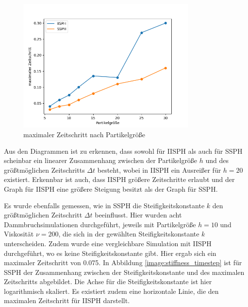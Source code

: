 \documentclass{scrreprt}
\begin{document}
\begin{figure}[htb]
    \includegraphics[width=0.8\textwidth]{particle_size_timestep.png}
    \caption{maximaler Zeitschritt nach Partikelgröße}
    \label{image:particle_size_timestep}
\end{figure}
%

Aus den Diagrammen ist zu erkennen,
dass sowohl für IISPH als auch für SSPH scheinbar ein linearer Zusammenhang zwischen der Partikelgröße $h$ und des größtmöglichen Zeitschritts $\Delta t$ besteht,
wobei in IISPH ein Ausreißer für $h = 20$ existiert.
Erkennbar ist auch, dass IISPH größere Zeitschritte erlaubt und der Graph für IISPH eine größere Steigung besitzt als der Graph für SSPH.

Es wurde ebenfalls gemessen, wie in SSPH die Steifigkeitskonstante $k$ den größtmöglichen Zeitschritt $\Delta t$ beeinflusst.
Hier wurden acht Dammbruchsimulationen durchgeführt, jeweils mit Partikelgröße $h = 10$ und Viskosität $\nu = 200$,
die sich in der gewählten Steifigkeitskonstante $k$ unterscheiden.
Zudem wurde eine vergleichbare Simulation mit IISPH durchgeführt, wo es keine Steifigkeitskonstante gibt. 
Hier ergab sich ein maximaler Zeitschritt von 0.075.
In Abbildung \ref{image:stiffness_timestep} ist für SSPH der Zusammenhang zwischen der Steifigkeitskonstante und des maximalen Zeitschritts abgebildet.
Die Achse für die Steifigkeitskonstante ist hier logarithmisch skaliert.
Es existiert zudem eine horizontale Linie, die den maximalen Zeitschritt für IISPH darstellt.
\end{document}

